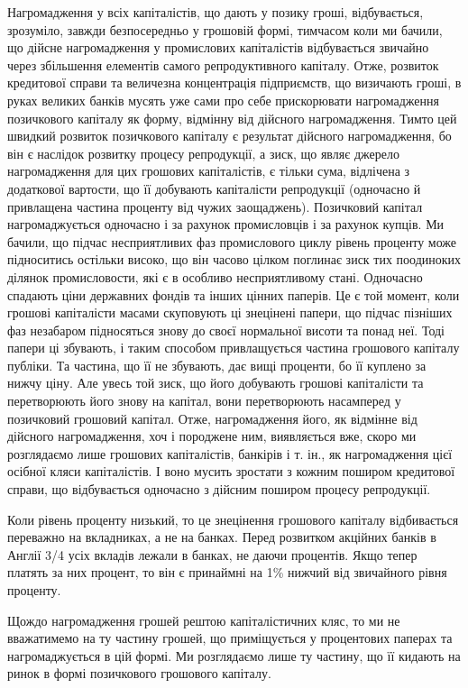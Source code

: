Нагромадження у всіх капіталістів, що дають у позику гроші, відбувається,
зрозуміло, завжди безпосередньо у грошовій формі, тимчасом коли ми бачили, що
дійсне нагромадження у промислових капіталістів відбувається звичайно через
збільшення елементів самого репродуктивного капіталу. Отже, розвиток кредитової
справи та величезна концентрація підприємств, що визичають гроші, в руках
великих банків мусять уже сами про себе прискорювати нагромадження позичкового
капіталу як форму, відмінну від дійсного нагромадження. Тимто цей
швидкий розвиток позичкового капіталу є результат дійсного нагромадження,
бо він є наслідок розвитку процесу репродукції, а зиск, що являє джерело нагромадження
для цих грошових капіталістів, є тільки сума, відлічена з додаткової
вартости, що її добувають капіталісти репродукції (одночасно й привлащена
частина проценту від чужих заощаджень). Позичковий капітал нагромаджується
одночасно і за рахунок промисловців і за рахунок купців. Ми бачили, що
підчас несприятливих фаз промислового циклу рівень проценту може підноситись
остільки високо, що він часово цілком поглинає зиск тих поодиноких ділянок
промисловости, які є в особливо несприятливому стані. Одночасно спадають ціни
державних фондів та інших цінних паперів. Це є той момент, коли грошові
капіталісти масами скуповують ці знецінені папери, що підчас пізніших фаз
незабаром підносяться знову до своєї нормальної висоти та понад неї. Тоді
папери ці збувають, і таким способом привлащується частина грошового капіталу
публіки. Та частина, що її не збувають, дає вищі проценти, бо її куплено
за нижчу ціну. Але увесь той зиск, що його добувають грошові капіталісти та
перетворюють його знову на капітал, вони перетворюють насамперед у позичковий
грошовий капітал. Отже, нагромадження його, як відмінне від дійсного нагромадження,
хоч і породжене ним, виявляється вже, скоро ми розглядаємо лише грошових
капіталістів, банкірів і т. ін., як нагромадження цієї осібної кляси капіталістів.
І воно мусить зростати з кожним поширом кредитової справи, що відбувається
одночасно з дійсним поширом процесу репродукції.

Коли рівень проценту низький, то це знецінення грошового капіталу відбивається
переважно на вкладниках, а не на банках. Перед розвитком акційних
банків в Англії 3/4 усіх вкладів лежали в банках, не даючи процентів. Якщо тепер
платять за них процент, то він є принаймні на 1\% нижчий від звичайного
рівня проценту.

Щождо нагромадження грошей рештою капіталістичних кляс, то ми не
вважатимемо на ту частину грошей, що приміщується у процентових паперах
та нагромаджується в цій формі. Ми розглядаємо лише ту частину, що її кидають
на ринок в формі позичкового грошового капіталу.

